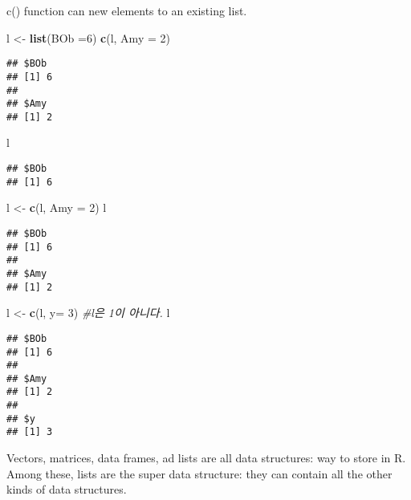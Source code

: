 \documentclass[
]{article}
\newenvironment{Shaded}{\begin{snugshade}}{\end{snugshade}}
\newcommand{\CommentTok}[1]{\textcolor[rgb]{0.56,0.35,0.01}{\textit{#1}}}
\newcommand{\DataTypeTok}[1]{\textcolor[rgb]{0.13,0.29,0.53}{#1}}
\newcommand{\DecValTok}[1]{\textcolor[rgb]{0.00,0.00,0.81}{#1}}
\newcommand{\KeywordTok}[1]{\textcolor[rgb]{0.13,0.29,0.53}{\textbf{#1}}}
\newcommand{\NormalTok}[1]{#1}
\newcommand{\StringTok}[1]{\textcolor[rgb]{0.31,0.60,0.02}{#1}}
\begin{document}
c() function can new elements to an existing list.

\begin{Shaded}
\begin{Highlighting}[]
\NormalTok{l <-}\StringTok{ }\KeywordTok{list}\NormalTok{(}\DataTypeTok{BOb =}\DecValTok{6}\NormalTok{)}
\KeywordTok{c}\NormalTok{(l, }\DataTypeTok{Amy =} \DecValTok{2}\NormalTok{)}
\end{Highlighting}
\end{Shaded}

\begin{verbatim}
## $BOb
## [1] 6
## 
## $Amy
## [1] 2
\end{verbatim}

\begin{Shaded}
\begin{Highlighting}[]
\NormalTok{l}
\end{Highlighting}
\end{Shaded}

\begin{verbatim}
## $BOb
## [1] 6
\end{verbatim}

\begin{Shaded}
\begin{Highlighting}[]
\NormalTok{l <-}\StringTok{ }\KeywordTok{c}\NormalTok{(l, }\DataTypeTok{Amy =} \DecValTok{2}\NormalTok{)}
\NormalTok{l}
\end{Highlighting}
\end{Shaded}

\begin{verbatim}
## $BOb
## [1] 6
## 
## $Amy
## [1] 2
\end{verbatim}

\begin{Shaded}
\begin{Highlighting}[]
\NormalTok{l <-}\StringTok{ }\KeywordTok{c}\NormalTok{(l, }\DataTypeTok{y=} \DecValTok{3}\NormalTok{) }\CommentTok{#l은 1이 아니다.}
\NormalTok{l}
\end{Highlighting}
\end{Shaded}

\begin{verbatim}
## $BOb
## [1] 6
## 
## $Amy
## [1] 2
## 
## $y
## [1] 3
\end{verbatim}

Vectors, matrices, data frames, ad lists are all data structures: way to
store in R. Among these, lists are the super data structure: they can
contain all the other kinds of data structures.
\end{document}
